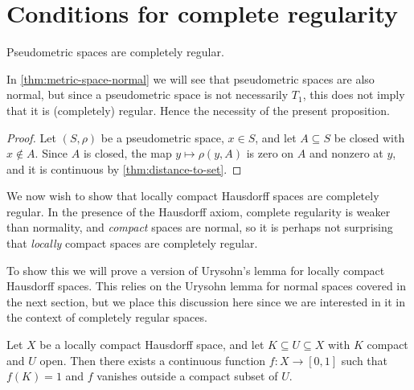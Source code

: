 \documentclass[article, a4paper, 11pt, oneside]{memoir}
\numberwithin{equation}{chapter}
\begin{document}
\section{Conditions for complete regularity}

\begin{proposition}
    \label{thm:pseudometric-completely-regular}
    Pseudometric spaces are completely regular.
\end{proposition}
%
In \cref{thm:metric-space-normal} we will see that pseudometric spaces are also normal, but since a pseudometric space is not necessarily $T_1$, this does not imply that it is (completely) regular. Hence the necessity of the present proposition.

\begin{proof}
    Let $(S,\rho)$ be a pseudometric space, $x \in S$, and let $A \subseteq S$ be closed with $x \not\in A$. Since $A$ is closed, the map $y \mapsto \rho(y,A)$ is zero on $A$ and nonzero at $y$, and it is continuous by \cref{thm:distance-to-set}.
\end{proof}


We now wish to show that locally compact Hausdorff spaces are completely regular. In the presence of the Hausdorff axiom, complete regularity is weaker than normality, and \emph{compact} spaces are normal, so it is perhaps not surprising that \emph{locally} compact spaces are completely regular.

To show this we will prove a version of Urysohn's lemma for locally compact Hausdorff spaces. This relies on the Urysohn lemma for normal spaces covered in the next section, but we place this discussion here since we are interested in it in the context of completely regular spaces.


\begin{theorem}
    \label{thm:Urysohn-LCH}
    Let $X$ be a locally compact Hausdorff space, and let $K \subseteq U \subseteq X$ with $K$ compact and $U$ open. Then there exists a continuous function $f \colon X \to [0,1]$ such that $f(K) = 1$ and $f$ vanishes outside a compact subset of $U$.
\end{theorem}
\end{document}
